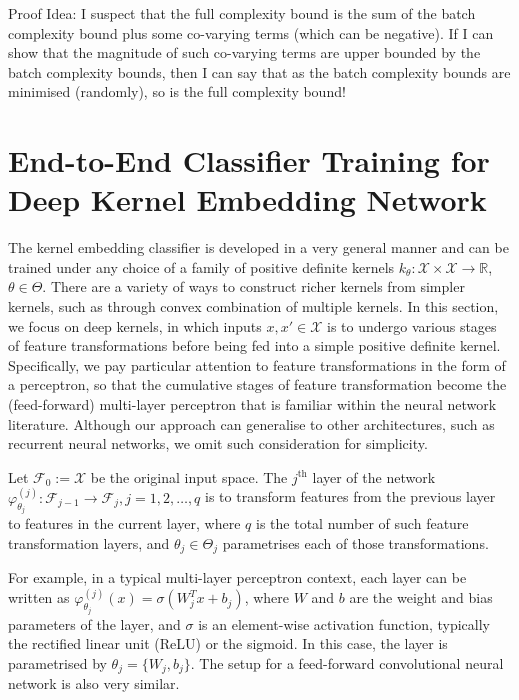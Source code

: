 \documentclass{article}
\begin{document}
		Proof Idea: I suspect that the full complexity bound is the sum of the batch complexity bound plus some co-varying terms (which can be negative). If I can show that the magnitude of such co-varying terms are upper bounded by the batch complexity bounds, then I can say that as the batch complexity bounds are minimised (randomly), so is the full complexity bound!
	
\section{End-to-End Classifier Training for Deep Kernel Embedding Network}
\label{sec:deep_kernel_embeddings}

	The kernel embedding classifier is developed in a very general manner and can be trained under any choice of a family of positive definite kernels $k_{\theta} : \mathcal{X} \times \mathcal{X} \to \mathbb{R}$, $\theta \in \Theta$. There are a variety of ways to construct richer kernels from simpler kernels, such as through convex combination of multiple kernels. In this section, we focus on deep kernels, in which inputs $x, x' \in \mathcal{X}$ is to undergo various stages of feature transformations before being fed into a simple positive definite kernel. Specifically, we pay particular attention to feature transformations in the form of a perceptron, so that the cumulative stages of feature transformation become the (feed-forward) multi-layer perceptron that is familiar within the neural network literature. Although our approach can generalise to other architectures, such as recurrent neural networks, we omit such consideration for simplicity.
	
	Let $\mathcal{F}_{0} := \mathcal{X}$ be the original input space. The $j^{\mathrm{th}}$ layer of the network $\varphi^{(j)}_{\theta_{j}} : \mathcal{F}_{j - 1} \to \mathcal{F}_{j}, j = 1, 2, \dots, q$ is to transform features from the previous layer to features in the current layer, where $q$ is the total number of such feature transformation layers, and $\theta_{j} \in \Theta_{j}$ parametrises each of those transformations.
	
	For example, in a typical multi-layer perceptron context, each layer can be written as $\varphi^{(j)}_{\theta_{j}}(x) = \sigma(W_{j}^{T} x + b_{j})$, where $W$ and $b$ are the weight and bias parameters of the layer, and $\sigma$ is an element-wise activation function, typically the rectified linear unit (ReLU) or the sigmoid. In this case, the layer is parametrised by $\theta_{j} = \{W_{j}, b_{j}\}$. The setup for a feed-forward convolutional neural network is also very similar.
	
\end{document}
